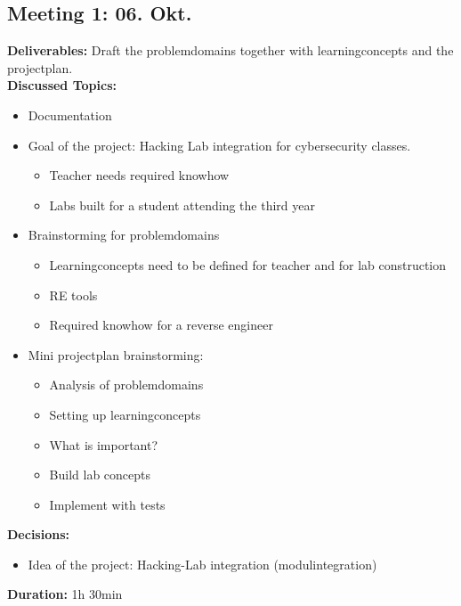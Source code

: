 \subsection*{Meeting 1: 06. Okt.}
\textbf{Deliverables:} Draft the problemdomains together with learningconcepts and the projectplan. \\
\textbf{Discussed Topics:} 
\begin{itemize}
    \item Documentation
    \item Goal of the project: Hacking Lab integration for cybersecurity classes.
    \begin{itemize}
        \item Teacher needs required knowhow
        \item Labs built for a student attending the third year
    \end{itemize}
    \item Brainstorming for problemdomains
    \begin{itemize}
        \item Learningconcepts need to be defined for teacher and for lab construction
        \item RE tools
        \item Required knowhow for a reverse engineer
    \end{itemize}
    \item Mini projectplan brainstorming:
    \begin{itemize}
        \item Analysis of problemdomains
        \item Setting up learningconcepts
        \item What is important?
        \item Build lab concepts
        \item Implement with tests
    \end{itemize}
\end{itemize}
\textbf{Decisions:} 
\begin{itemize}
    \item Idea of the project: Hacking-Lab integration (modulintegration)
\end{itemize}
\textbf{Duration:} 1h 30min

\newpage
